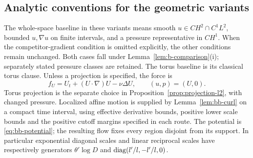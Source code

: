 \subsection{Analytic conventions for the geometric variants}\label{bc:analytic-section}
The whole-space baseline in these variants means smooth
$u\in CH^2\cap C^1L^2$, bounded $u,\nabla u$ on finite intervals,
and a pressure representative in $CH^1$. When the competitor-gradient
condition is omitted explicitly, the other conditions remain unchanged.
Both cases fall under Lemma~\ref{lem:b-comparison}(i); separately stated
pressure classes are retained. The torus baseline is its classical torus
clause. Unless a projection is specified, the force is
\begin{equation}\label{bc:residual}
f_U=U_t+(U\cdot\nabla)U-\nu\Delta U,\qquad (u,p)=(U,0).
\end{equation}
Torus projection is the separate choice in
Proposition~\ref{prop:projection-l2}, with changed pressure.
Localized affine motion is supplied by Lemma~\ref{lem:bb-curl} on a
compact time interval, using effective derivative bounds, positive lower
scale bounds and the positive cutoff margins specified in each route.
The potential is \eqref{eq:bb-potential}; the resulting flow fixes every
region disjoint from its support. In particular exponential diagonal
scales and linear reciprocal scales have respectively generators
$\theta'\log D$ and $\operatorname{diag}(l'/l,-l'/l,0)$.

